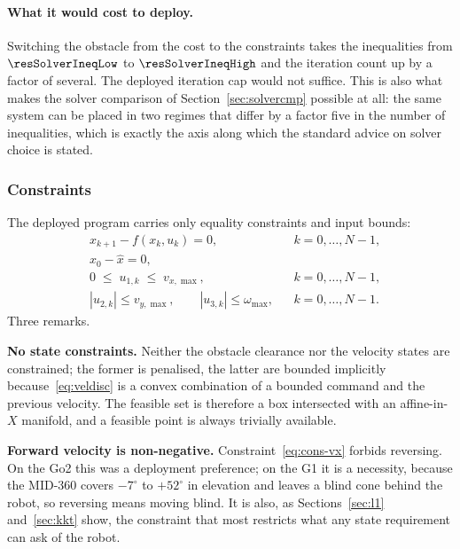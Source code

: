 \documentclass[11pt,a4paper]{article}
\begin{document}
\paragraph{What it would cost to deploy.} Switching the obstacle from the cost to the constraints takes the
inequalities from $\resSolverIneqLow$ to $\resSolverIneqHigh$ and the iteration count up by a factor of
several. The deployed iteration cap would not suffice. This is also what makes the solver comparison of
Section~\ref{sec:solvercmp} possible at all: the same system can be placed in two regimes that differ by a
factor five in the number of inequalities, which is exactly the axis along which the standard advice on
solver choice is stated.

\subsubsection{Constraints}
\label{sec:constraints}

The deployed program carries only equality constraints and input bounds:
\begin{subequations}
\label{eq:cons}
\begin{align}
  & x_{k+1}-f(x_k,u_k)=0, && k=0,\dots,N-1, \label{eq:cons-dyn}\\
  & x_0-\hat x=0, \label{eq:cons-init}\\
  & 0\;\le\;u_{1,k}\;\le\;v_{x,\max}, && k=0,\dots,N-1, \label{eq:cons-vx}\\
  & |u_{2,k}|\le v_{y,\max},\qquad |u_{3,k}|\le\omega_{\max}, && k=0,\dots,N-1. \label{eq:cons-vyw}
\end{align}
\end{subequations}
Three remarks.

\textbf{No state constraints.} Neither the obstacle clearance nor the velocity states are constrained; the
former is penalised, the latter are bounded implicitly because~\eqref{eq:veldisc} is a convex combination of
a bounded command and the previous velocity. The feasible set is therefore a box intersected with an
affine-in-$X$ manifold, and a feasible point is always trivially available.

\textbf{Forward velocity is non-negative.} Constraint~\eqref{eq:cons-vx} forbids reversing. On the Go2 this
was a deployment preference; on the G1 it is a necessity, because the MID-360 covers $-7^\circ$ to
$+52^\circ$ in elevation and leaves a blind cone behind the robot, so reversing means moving blind. It is
also, as Sections~\ref{sec:l1} and~\ref{sec:kkt} show, the constraint that most restricts what any state
requirement can ask of the robot.
\end{document}
